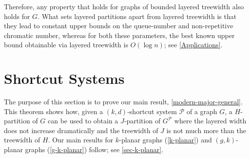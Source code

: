 \documentclass{patmorin}
\begin{document}
Therefore, any property that holds for graphs of bounded layered treewidth also holds for $G$. What sets layered partitions apart from layered treewidth is that they lead to constant upper bounds on the queue-number  and non-repetitive chromatic number, whereas for both these parameters, the best known upper bound obtainable via layered treewidth is $O(\log n)$; see \cref{Applications}. 



%
%



\section{Shortcut Systems}
\label{Structure}

The purpose of this section is to prove our main result, \cref{modern-major-general}. This theorem shows how, given a $(k,d)$-shortcut system $\mathcal{P}$ of a graph $G$, a $H$-partition of $G$ can be used to obtain a $J$-partition of $G^{\mathcal{P}}$ where the layered width  does not increase dramatically and the treewidth of $J$ is not much more than the treewidth of $H$.  Our main results for $k$-planar graphs (\cref{k-planar}) and $(g,k)$-planar graphs (\cref{g-k-planar}) follow; see \cref{sec-k-planar}.
\end{document}
